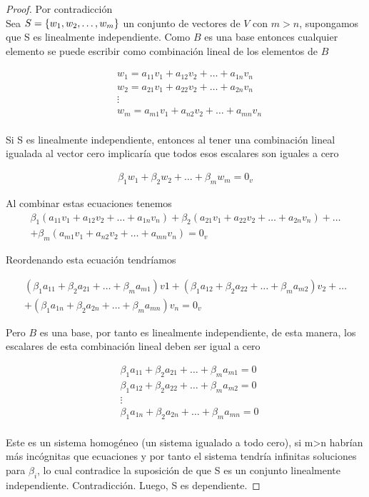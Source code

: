\begin{proof}
Por contradicci\'on ~\\
Sea $S= \lbrace w_1, w_2, \ldots, w_m \rbrace$ un conjunto de vectores de $V$ con $m>n$, supongamos que S es linealmente independiente. Como $B$ es una base entonces cualquier elemento se puede escribir como combinaci\'on lineal de los elementos de $B$

\begin{eqnarray*}
&w_1=a_{11} v_1+a_{12} v_2 +\ldots +a_{1n} v_n\\
&w_2=a_{21} v_1+a_{22} v_2 +\ldots +a_{2n} v_n\\
&\vdots\\
&w_m=a_{m1} v_1+a_{n2} v_2 +\ldots +a_{mn} v_n\\
\end{eqnarray*}

Si S es linealmente independiente, entonces al tener una combinaci\'on lineal igualada al vector cero implicar\'ia que todos esos escalares son iguales a cero

\begin{eqnarray*}
\beta_1 w_1+\beta_2 w_2 +\ldots +\beta_m w_m=0_v
\end{eqnarray*}

Al combinar estas ecuaciones tenemos
\begin{eqnarray*}
\beta_1 (a_{11} v_1+a_{12} v_2 +\ldots +a_{1n} v_n)+
\beta_2 (a_{21} v_1+a_{22} v_2 +\ldots +a_{2n} v_n) +\ldots \\+
\beta_m (a_{m1} v_1+a_{n2} v_2 +\ldots +a_{mn} v_n)
=0_v
\end{eqnarray*}

Reordenando esta ecuaci\'on tendr\'iamos


\begin{eqnarray*}
(\beta_1 a_{11}+\beta_2 a_{21}+\ldots+\beta_m a_{m1})v1+
(\beta_1 a_{12}+\beta_2 a_{22}+\ldots+\beta_m a_{m2})v_2+
\ldots\\+
(\beta_1 a_{1n}+\beta_2 a_{2n}+\ldots+\beta_m a_{mn})v_n=0_v
\end{eqnarray*}

Pero $B$ es una base, por tanto es linealmente independiente, de esta manera, los escalares de esta combinaci\'on lineal deben ser igual a cero

\begin{eqnarray*}
&\beta_1 a_{11}+\beta_2 a_{21}+\ldots+\beta_m a_{m1}=0\\
&\beta_1 a_{12}+\beta_2 a_{22}+\ldots+\beta_m a_{m2}=0\\
&\vdots\\
&\beta_1 a_{1n}+\beta_2 a_{2n}+\ldots+\beta_m a_{mn}=0\\
\end{eqnarray*}

Este es un sistema homog\'{e}neo (un sistema igualado a todo cero), si m>n habr\'{i}an m\'{a}s inc\'ognitas que ecuaciones y por tanto el sistema tendr\'{i}a infinitas soluciones para $\beta_i$, lo cual contradice la suposici\'on de que S es un conjunto linealmente independiente. Contradicci\'on. Luego, S es dependiente.

\end{proof}

